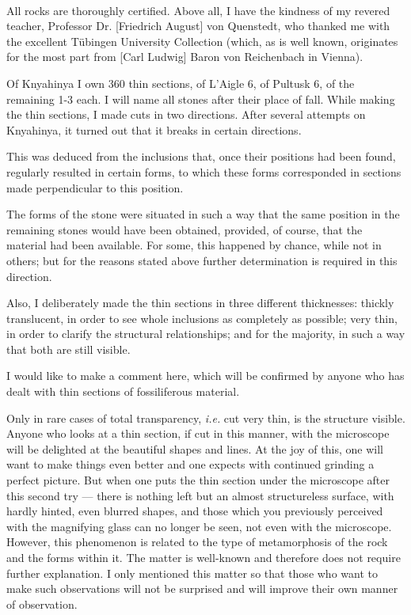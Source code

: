 \documentclass[a4paper, 12pt, oneside]{article}
\begin{document}
\paragraph*{}
All rocks are thoroughly certified. Above all, I have the kindness of my revered teacher, Professor Dr. [Friedrich August] von Quenstedt, who thanked me with the excellent Tübingen University Collection (which, as is well known, originates for the most part from [Carl Ludwig] Baron von Reichenbach in Vienna).

Of Knyahinya I own 360 thin sections, of L'Aigle 6, of Pultusk 6, of the remaining 1-3 each. I will name all stones after their place of fall. While making the thin sections, I made cuts in two directions. After several attempts on Knyahinya, it turned out that it breaks in certain directions.

This was deduced from the inclusions that, once their positions had been found, regularly resulted in certain forms, to which these forms corresponded in sections made perpendicular to this position.

The forms of the stone were situated in such a way that the same position in the remaining stones would have been obtained, provided, of course, that the material had been available. For some, this happened by chance, while not in others; but for the reasons stated above further determination is required in this direction.

Also, I deliberately made the thin sections in three different thicknesses: thickly translucent, in order to see whole inclusions as completely as possible; very thin, in order to clarify the structural relationships; and for the majority, in such a way that both are still visible.

I would like to make a comment here, which will be confirmed by anyone who has dealt with thin sections of fossiliferous material.

Only in rare cases of total transparency, \emph{i.e.} cut very thin, is the structure visible. Anyone who looks at a thin section, if cut in this manner, with the microscope will be delighted at the beautiful shapes and lines. At the joy of this, one will want to make things even better and one expects with continued grinding a perfect picture. But when one puts the thin section under the microscope after this second try --- there is nothing left but an almost structureless surface, with hardly hinted, even blurred shapes, and those which you previously perceived with the magnifying glass can no longer be seen, not even with the microscope. However, this phenomenon is related to the type of metamorphosis of the rock and the forms within it. The matter is well-known and therefore does not require further explanation. I only mentioned this matter so that those who want to make such observations will not be surprised and will improve their own manner of observation.
\end{document}
